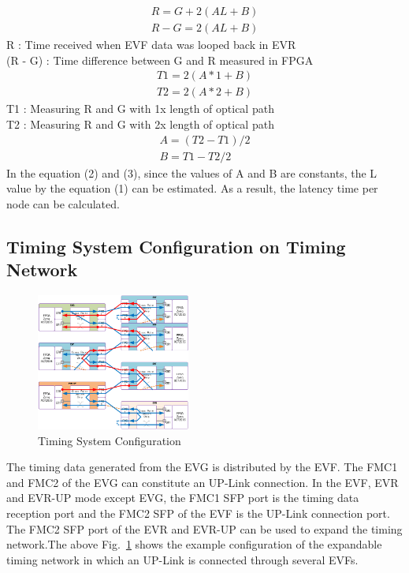 \documentclass[journal,reqno]{IEEEtran}
\begin{document}
\begin {align} \label{eqn_r}
R = G + 2(AL + B) \nonumber \\
R - G = 2(AL + B) 
\end {align}
R : Time received when EVF data was looped back in EVR \\
(R - G) : Time difference between G and R measured in FPGA
\begin {align*}
T1 = 2(A*1 + B) \\
T2 = 2(A*2 + B)
\end {align*}
T1 : Measuring R and G with 1x length of optical path \\
T2 : Measuring R and G with 2x length of optical path
\begin {align}
A = (T2 - T1)/2 \\
B = T1 - T2/2
\end {align}
In the equation (2) and (3), since the values of A and B are constants, the L value by the equation (1) can be estimated.
As a result, the latency time per node can be calculated.

\subsection{Timing System Configuration on Timing Network}

\begin{figure}[!htb]
	\centering
	\includegraphics*[width=0.45\textwidth, height=0.4\textwidth]{img14.png}
	\caption{Timing System Configuration}
	\label{timing_conf}
\end{figure}
The timing data generated from the EVG is distributed by the EVF. The FMC1 and FMC2 of the EVG can constitute an UP-Link connection. In the EVF, EVR and EVR-UP mode except EVG, the FMC1 SFP port is the timing data reception port and the FMC2 SFP of the EVF is the UP-Link connection port. The FMC2 SFP port of the EVR and EVR-UP can be used to expand the timing network.The above Fig.~\ref{timing_conf} shows the example configuration of the expandable timing network in which an UP-Link is connected through several EVFs.
\end{document}
